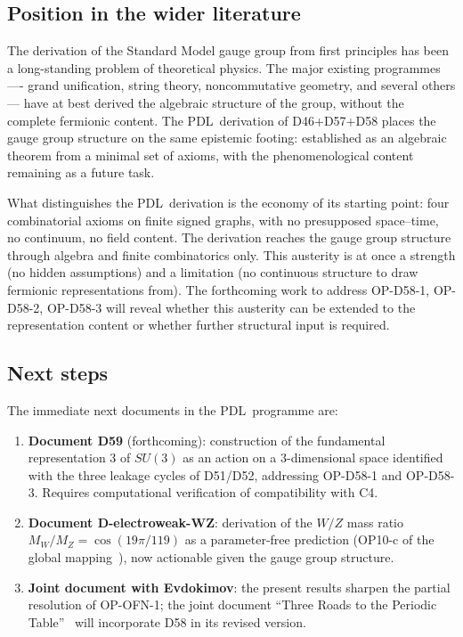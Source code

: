 \documentclass[11pt,a4paper]{article}
\def\SUthree{SU(3)}%
\def\PDL{PDL}%
\def\mathrm#1{#1}%
\def\mathbf#1{#1}%
\def\textsc#1{#1}%
\theoremstyle{plain}
\theoremstyle{definition}
\theoremstyle{remark}
\newcommand{\PDL}{\textsc{PDL}}
\newcommand{\SUthree}{\mathrm{SU}(3)}
\begin{document}
\subsection{Position in the wider literature}

The derivation of the Standard Model gauge group from first principles has been a long-standing problem of theoretical physics. The major existing programmes ---- grand unification, string theory, noncommutative geometry, and several others --- have at best derived the algebraic structure of the group, without the complete fermionic content. The \PDL\ derivation of D46+D57+D58 places the gauge group structure on the same epistemic footing: established as an algebraic theorem from a minimal set of axioms, with the phenomenological content remaining as a future task.

What distinguishes the \PDL\ derivation is the economy of its starting point: four combinatorial axioms on finite signed graphs, with no presupposed space--time, no continuum, no field content. The derivation reaches the gauge group structure through algebra and finite combinatorics only. This austerity is at once a strength (no hidden assumptions) and a limitation (no continuous structure to draw fermionic representations from). The forthcoming work to address OP-D58-1, OP-D58-2, OP-D58-3 will reveal whether this austerity can be extended to the representation content or whether further structural input is required.

\subsection{Next steps}

The immediate next documents in the \PDL\ programme are:
\begin{enumerate}[leftmargin=2em]
\item \textbf{Document D59} (forthcoming): construction of the fundamental representation $\mathbf{3}$ of $\SUthree$ as an action on a 3-dimensional space identified with the three leakage cycles of D51/D52, addressing OP-D58-1 and OP-D58-3. Requires computational verification of compatibility with C4.
\item \textbf{Document D-electroweak-WZ}: derivation of the $W/Z$ mass ratio $M_W/M_Z = \cos(19\pi/119)$ as a parameter-free prediction (OP10-c of the global mapping~\cite{PDL_DM}), now actionable given the gauge group structure.
\item \textbf{Joint document with Evdokimov}: the present results sharpen the partial resolution of OP-OFN-1; the joint document ``Three Roads to the Periodic Table''~\cite{Evdokimov_TwoRoads} will incorporate D58 in its revised version.
\end{enumerate}
\end{document}
